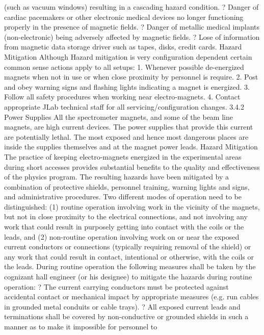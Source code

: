 { 			(such as vacuum windows) resulting in a cascading hazard condition.
	? 	Danger of cardiac pacemakers or other electronic medical devices no longer 
			functioning properly in the presence of magnetic fields.
	? 	Danger of metallic medical implants (non-electronic) being adversely affected
 			by magnetic fields.
	? 	Lose of information from magnetic data storage driver such as tapes, disks, 
			credit cards.
Hazard Mitigation
Although Hazard mitigation is very configuration dependent certain common sense actions apply to all setups:
 1. Whenever possible de-energized magnets when not in use or when close proximity by personnel is require.
	2. Post and obey warning signs and flashing lights indicating a magnet is energized.
	3. Follow all safety procedures when working near electro-magnets.
	4. Contact appropriate JLab technical staff for all servicing/configuration changes.
3.4.2		Power Supplies 
	All the spectrometer magnets, and some of the beam line magnets, are high current devices. The power supplies that provide this current are potentially lethal. The most exposed and hence most dangerous places are inside the supplies themselves and at the magnet power leads.
Hazard Mitigation	
	The practice of keeping electro-magnets energized in the experimental areas during short accesses provides substantial benefits to the quality and effectiveness of the physics program. The resulting hazards have been mitigated by a combination of protective shields, personnel training, warning lights and signs, and administrative procedures. Two different modes of operation need to be distinguished: (1) routine operation involving work in the vicinity of the magnets, but not in close proximity to the electrical connections, and not involving any work that could result in purposely getting into contact with the coils or the leads, and (2) non-routine operation involving work on or near the exposed current conductors or connections (typically requiring removal of the shield) or any work that could result in contact, intentional or otherwise, with the coils or the leads.
	During routine operation the following measures shall be taken by the cognizant hall engineer (or his designee) to mitigate the hazards during routine operation:
? 	The current carrying conductors must be protected against accidental contact or
  	mechanical impact by appropriate measures (e.g. run cables in grounded metal
 	conduits or cable trays).
	? 	All exposed current leads and terminations shall be covered by non-conductive
			or grounded shields in such a manner as to make it impossible for personnel to
}
